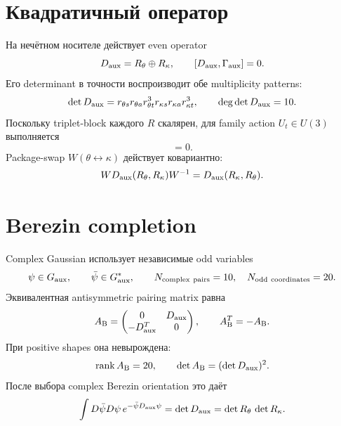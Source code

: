 \section{Квадратичный оператор}

На нечётном носителе действует even operator
\begin{equation}
 D_{\rm aux}=R_\theta\oplus R_\kappa,
 \qquad [D_{\rm aux},\Gamma_{\rm aux}]=0.
 \label{eq:v9-kms-aux-fermion-operator}
\end{equation}
Его determinant в точности воспроизводит обе multiplicity patterns:
\begin{equation}
 \det D_{\rm aux}
 =r_{\theta s}r_{\theta a}r_{\theta t}^{3}
  r_{\kappa s}r_{\kappa a}r_{\kappa t}^{3},
 \qquad \deg\det D_{\rm aux}=10.
 \label{eq:v9-kms-aux-fermion-determinant}
\end{equation}
Поскольку triplet-block каждого $R$ скалярен, для family action
$U_t\in U(3)$ выполняется
\begin{equation}
 [D_{\rm aux},
  (1_s\oplus1_a\oplus U_t)\otimes I_2]=0.
 \label{eq:v9-kms-aux-fermion-family-covariance}
\end{equation}
Package-swap $W(\theta\leftrightarrow\kappa)$ действует ковариантно:
\begin{equation}
 W D_{\rm aux}(R_\theta,R_\kappa)W^{-1}
 =D_{\rm aux}(R_\kappa,R_\theta).
 \label{eq:v9-kms-aux-fermion-package-swap}
\end{equation}

\section{Berezin completion}

Complex Gaussian использует независимые odd variables
\begin{equation}
 \psi\in G_{\rm aux},
 \qquad \bar\psi\in G_{\rm aux}^{*},
 \qquad
 N_{\rm complex\ pairs}=10,\quad N_{\rm odd\ coordinates}=20.
 \label{eq:v9-kms-aux-fermion-complex-pairs}
\end{equation}
Эквивалентная antisymmetric pairing matrix равна
\begin{equation}
 A_{\rm B}=
 \begin{pmatrix}
 0&D_{\rm aux}\\
 -D_{\rm aux}^{T}&0
 \end{pmatrix},
 \qquad A_{\rm B}^{T}=-A_{\rm B}.
 \label{eq:v9-kms-aux-fermion-berezin-pairing}
\end{equation}
При positive shapes она невырождена:
\begin{equation}
 \operatorname{rank} A_{\rm B}=20,
 \qquad
 \det A_{\rm B}=(\det D_{\rm aux})^2.
 \label{eq:v9-kms-aux-fermion-pairing-rank}
\end{equation}
После выбора complex Berezin orientation это даёт
\begin{equation}
 \int D\bar\psi D\psi\,
 e^{-\bar\psi D_{\rm aux}\psi}
 =\det D_{\rm aux}
 =\det R_\theta\,\det R_\kappa.
 \label{eq:v9-kms-aux-fermion-integral}
\end{equation}

